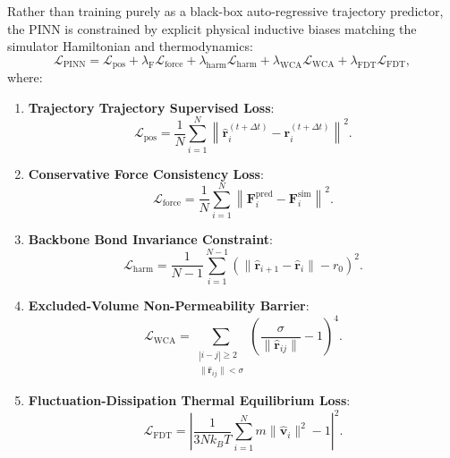 \documentclass[12pt,a4paper]{article}
\begin{document}
Rather than training purely as a black-box auto-regressive trajectory predictor, the PINN is constrained by explicit physical inductive biases matching the simulator Hamiltonian and thermodynamics:
\begin{equation}
  \mathcal{L}_\text{PINN} = \mathcal{L}_\text{pos} + \lambda_\text{F} \mathcal{L}_\text{force} + \lambda_\text{harm} \mathcal{L}_\text{harm} + \lambda_\text{WCA} \mathcal{L}_\text{WCA} + \lambda_\text{FDT} \mathcal{L}_\text{FDT},
  \label{eq:pinn-total-loss}
\end{equation}
where:
\begin{enumerate}[label=\arabic*)]
  \item \textbf{Trajectory Trajectory Supervised Loss}:
    \begin{equation}
      \mathcal{L}_\text{pos} = \frac{1}{N} \sum_{i=1}^N \left\| \hat{\mathbf{r}}_i^{(t+\Delta t)} - \mathbf{r}_i^{(t+\Delta t)} \right\|^2.
    \end{equation}

  \item \textbf{Conservative Force Consistency Loss}:
    \begin{equation}
      \mathcal{L}_\text{force} = \frac{1}{N} \sum_{i=1}^N \left\| \mathbf{F}_i^\text{pred} - \mathbf{F}_i^\text{sim} \right\|^2.
    \end{equation}

  \item \textbf{Backbone Bond Invariance Constraint}:
    \begin{equation}
      \mathcal{L}_\text{harm} = \frac{1}{N-1} \sum_{i=1}^{N-1} \left( \|\hat{\mathbf{r}}_{i+1} - \hat{\mathbf{r}}_i\| - r_0 \right)^2.
    \end{equation}

  \item \textbf{Excluded-Volume Non-Permeability Barrier}:
    \begin{equation}
      \mathcal{L}_\text{WCA} = \sum_{\substack{|i-j| \geq 2 \\ \|\hat{\mathbf{r}}_{ij}\| < \sigma}} \left( \frac{\sigma}{\|\hat{\mathbf{r}}_{ij}\|} - 1 \right)^4.
    \end{equation}

  \item \textbf{Fluctuation-Dissipation Thermal Equilibrium Loss}:
    \begin{equation}
      \mathcal{L}_\text{FDT} = \left| \frac{1}{3N k_B T} \sum_{i=1}^N m \|\hat{\mathbf{v}}_i\|^2 - 1 \right|^2.
    \end{equation}
\end{enumerate}
\end{document}
